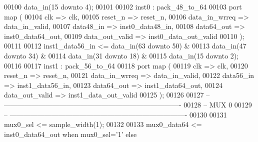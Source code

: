 \begin{DoxyCode}
00100                      \textcolor{vhdlchar}{data_in}\textcolor{vhdlchar}{(}\textcolor{vhdllogic}{}\textcolor{vhdllogic}{15} \textcolor{keywordflow}{downto} \textcolor{vhdllogic}{}\textcolor{vhdllogic}{4}\textcolor{vhdlchar}{)};
00101 
00102 inst0 : pack_48_to_64 
00103 \textcolor{keywordflow}{port} \textcolor{keywordflow}{map} (
00104        clk              => clk,
00105       reset_n           => reset_n,
00106         data_in_wrreq   => data_in_valid,
00107         data48_in       => inst0_data48_in,
00108         data64_out      => inst0_data64_out,
00109         data_out_valid  => inst0_data_out_valid
00110 \textcolor{vhdlchar}{)};
00111 
00112 inst1\_data56\_in <=   data\_in(\textcolor{vhdllogic}{63} \textcolor{keywordflow}{downto} \textcolor{vhdllogic}{50}) &
00113                      \textcolor{vhdlchar}{data_in}\textcolor{vhdlchar}{(}\textcolor{vhdllogic}{}\textcolor{vhdllogic}{47} \textcolor{keywordflow}{downto} \textcolor{vhdllogic}{}\textcolor{vhdllogic}{34}\textcolor{vhdlchar}{)} \textcolor{vhdlchar}{&} 
00114                      \textcolor{vhdlchar}{data_in}\textcolor{vhdlchar}{(}\textcolor{vhdllogic}{}\textcolor{vhdllogic}{31} \textcolor{keywordflow}{downto} \textcolor{vhdllogic}{}\textcolor{vhdllogic}{18}\textcolor{vhdlchar}{)} \textcolor{vhdlchar}{&} 
00115                      \textcolor{vhdlchar}{data_in}\textcolor{vhdlchar}{(}\textcolor{vhdllogic}{}\textcolor{vhdllogic}{15} \textcolor{keywordflow}{downto} \textcolor{vhdllogic}{}\textcolor{vhdllogic}{2}\textcolor{vhdlchar}{)};
00116 
00117 inst1 : pack_56_to_64 
00118 \textcolor{keywordflow}{port} \textcolor{keywordflow}{map} (
00119        clk              => clk,
00120       reset_n           => reset_n,
00121         data_in_wrreq   => data_in_valid,
00122         data56_in       => inst1_data56_in,
00123         data64_out      => inst1_data64_out,
00124         data_out_valid  => inst1_data_out_valid
00125 \textcolor{vhdlchar}{)};
00126 
00127 \textcolor{keyword}{-- ----------------------------------------------------------------------------}
00128 \textcolor{keyword}{-- MUX 0 }
00129 \textcolor{keyword}{-- ----------------------------------------------------------------------------}
00130 
00131 \textcolor{vhdlchar}{mux0_sel}                \textcolor{vhdlchar}{<=} \textcolor{vhdlchar}{sample_width}\textcolor{vhdlchar}{(}\textcolor{vhdllogic}{}\textcolor{vhdllogic}{1}\textcolor{vhdlchar}{)};
00132 
00133 \textcolor{vhdlchar}{mux0_data64}             \textcolor{vhdlchar}{<=} \textcolor{vhdlchar}{inst0_data64_out} \textcolor{keywordflow}{when} \textcolor{vhdlchar}{mux0_sel}\textcolor{vhdlchar}{=}\textcolor{vhdlchar}{'}\textcolor{vhdllogic}{}\textcolor{vhdllogic}{1}\textcolor{vhdlchar}{'} \textcolor{keywordflow}{else} 

\end{DoxyCode}
